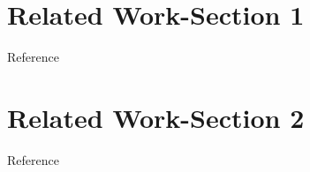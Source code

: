 \section{Related Work-Section 1}
Reference\cite{Bradford09}

\section{Related Work-Section 2}
Reference\cite{akama2009gaussian}
